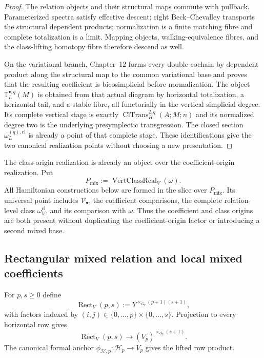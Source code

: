 \begin{proof}
The relation objects and their structural maps commute with pullback.
Parameterized spectra satisfy effective descent; right Beck--Chevalley transports
the structural dependent products; normalization is a finite matching fibre and
complete totalization is a limit.  Mapping objects, walking-equivalence fibres,
and the class-lifting homotopy fibre therefore descend as well.

On the variational branch, Chapter~12 forms every double cochain by dependent
product along the structural map to the common variational base and proves that
the resulting coefficient is bicosimplicial before normalization.  The object
$\mathbb T_L^{\bullet,q}(M)$ is obtained from that actual diagram by horizontal
totalization, a horizontal tail, and a stable fibre, all functorially in the
vertical simplicial degree.  Its complete vertical stage is exactly
$\operatorname{ClTrans}^{2,q}_H(A;M;n)$ and its normalized degree two is the
underlying presymplectic transgression.  The closed section
$\omega_L^{(q),\mathrm{cl}}$ is already a point of that complete stage.  These
identifications give the two canonical realization points without choosing a
new presentation.
\end{proof}

The class-origin realization is already an object over the coefficient-origin
realization.  Put
\[
\boxed{
P_{\mathrm{mix}}
:=
\operatorname{VertClassReal}_V(\omega).
}
\]
All Hamiltonian constructions below are formed in the slice over
$P_{\mathrm{mix}}$.  Its universal point includes
$\mathcal V_\bullet$, the coefficient comparisons, the complete relation-level
class $\omega_V^{\mathrm{cl}}$, and its comparison with $\omega$.  Thus the
coefficient and class origins are both present without duplicating the
coefficient-origin factor or introducing a second mixed base.

\subsection{Rectangular mixed relation and local mixed coefficients}
\label{subsec:prequantum-rectangular-mixed-relation}

For $p,s\ge0$ define
\[
\operatorname{Rect}_V(p,s)
:=
Y^{\times_{G_Y}(p+1)(s+1)},
\]
with factors indexed by
$(i,j)\in\{0,\ldots,p\}\times\{0,\ldots,s\}$.  Projection to every horizontal row
gives
\[
\operatorname{Rect}_V(p,s)
\longrightarrow
(V_p)^{\times_{G_Y}(s+1)}.
\]
The canonical formal anchor
$\phi_{\mathcal H,p}:\mathcal H_p\to V_p$ gives the lifted row product.

